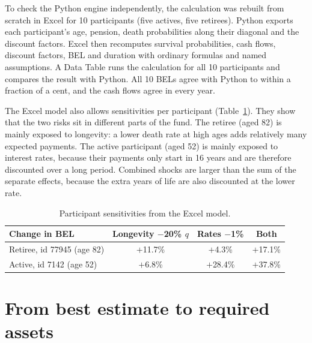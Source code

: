 \documentclass[11pt,a4paper]{article}
\begin{document}
To check the Python engine independently, the calculation was rebuilt from scratch in Excel for
10 participants (five actives, five retirees). Python exports each participant's age, pension,
death probabilities along their diagonal and the discount factors. Excel then recomputes
survival probabilities, cash flows, discount factors, BEL and duration with ordinary formulas
and named assumptions. A Data Table runs the calculation for all 10 participants and compares the
result with Python. All 10 BELs agree with Python to within a fraction of a cent, and the cash flows agree in every year.

The Excel model also allows sensitivities per participant (Table~\ref{tab:part}). They show that
the two risks sit in different parts of the fund. The retiree (aged 82) is mainly exposed to
longevity: a lower death rate at high ages adds relatively many expected payments. The active
participant (aged 52) is mainly exposed to interest rates, because their payments only start in
16 years and are therefore discounted over a long period. Combined shocks are larger than the sum of
the separate effects, because the extra years of life are also discounted at the lower rate.

\begin{table}[htbp]
  \centering
  \begin{tabular}{lccc}
    \toprule
    Change in BEL & Longevity $-$20\% $q$ & Rates $-$1\% & Both \\
    \midrule
    Retiree, id 77945 (age 82) & $+$11.7\% & $+$4.3\%  & $+$17.1\% \\
    Active, id 7142 (age 52)   & $+$6.8\%  & $+$28.4\% & $+$37.8\% \\
    \bottomrule
  \end{tabular}
  \caption{Participant sensitivities from the Excel model.}
  \label{tab:part}
\end{table}

\section{From best estimate to required assets}
\end{document}
